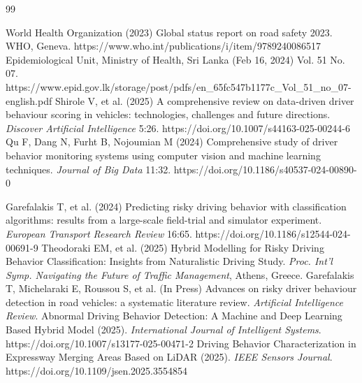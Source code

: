 \documentclass[pdflatex,sn-mathphys-num]{sn-jnl}
\theoremstyle{thmstyleone}
\theoremstyle{thmstyletwo}
\theoremstyle{thmstylethree}
\begin{document}
\begin{thebibliography}{99}

 World Health Organization (2023) Global status report on road safety 2023. WHO, Geneva. https://www.who.int/publications/i/item/9789240086517
 Epidemiological Unit, Ministry of Health, Sri Lanka (Feb 16, 2024) Vol. 51 No. 07. https://www.epid.gov.lk/storage/post/pdfs/en\_65fc547b1177c\_Vol\_51\_no\_07-english.pdf
 Shirole V, et al. (2025) A comprehensive review on data-driven driver behaviour scoring in vehicles: technologies, challenges and future directions. \textit{Discover Artificial Intelligence} 5:26. https://doi.org/10.1007/s44163-025-00244-6
 Qu F, Dang N, Furht B, Nojoumian M (2024) Comprehensive study of driver behavior monitoring systems using computer vision and machine learning techniques. \textit{Journal of Big Data} 11:32. https://doi.org/10.1186/s40537-024-00890-0

 Garefalakis T, et al. (2024) Predicting risky driving behavior with classification algorithms: results from a large-scale field-trial and simulator experiment. \textit{European Transport Research Review} 16:65. https://doi.org/10.1186/s12544-024-00691-9
 Theodoraki EM, et al. (2025) Hybrid Modelling for Risky Driving Behavior Classification: Insights from Naturalistic Driving Study. \textit{Proc. Int’l Symp. Navigating the Future of Traffic Management}, Athens, Greece.
 Garefalakis T, Michelaraki E, Roussou S, et al. (In Press) Advances on risky driver behaviour detection in road vehicles: a systematic literature review. \textit{Artificial Intelligence Review}.
 Abnormal Driving Behavior Detection: A Machine and Deep Learning Based Hybrid Model (2025). \textit{International Journal of Intelligent Systems}. https://doi.org/10.1007/s13177-025-00471-2
 Driving Behavior Characterization in Expressway Merging Areas Based on LiDAR (2025). \textit{IEEE Sensors Journal}. https://doi.org/10.1109/jsen.2025.3554854


\end{thebibliography}
\end{document}
